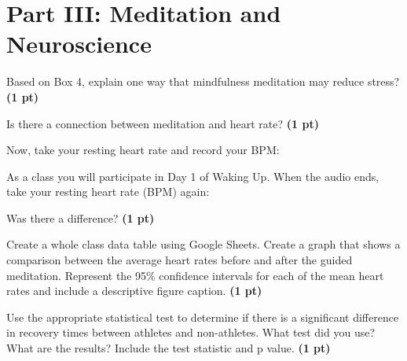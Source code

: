 \documentclass[12pt,a4paper]{article}
\begin{document}
\section*{Part III: Meditation and Neuroscience}
\begin{enumerate}[font=\bfseries, wide, resume]
    {\color{under}\item Based on Box 4, explain one way that mindfulness meditation may reduce stress? \textbf{(1 pt)}}
    
    
    {\color{under}\item Is there a connection between meditation and heart rate? \textbf{(1 pt)}}
    
    
    {\color{under}\item Now, take your resting heart rate and record your BPM:
    
    As a class you will participate in Day 1 of Waking Up.  When the audio ends, take your resting heart rate (BPM) again:

    Was there a difference? \textbf{(1 pt)}}
    
    {\color{under}\item Create a whole class data table using Google Sheets. Create a graph that shows a comparison between the average heart rates before and after the guided meditation. Represent the 95\% confidence intervals for each of the mean heart rates and include a descriptive figure caption. \textbf{(1 pt)}}
    
    
    {\color{under}\item Use the appropriate statistical test to determine if there is a significant difference in recovery times between athletes and non-athletes. What test did you use? What are the results? Include the test statistic and p value. \textbf{(1 pt)}}
    
    
\end{enumerate}
\end{document}
